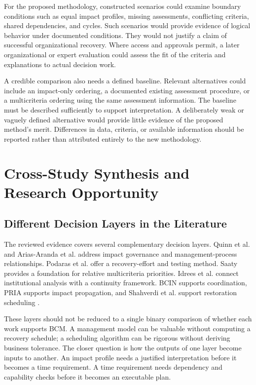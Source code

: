 For the proposed methodology, constructed scenarios could examine boundary conditions such as equal impact profiles, missing assessments, conflicting criteria, shared dependencies, and cycles. Such scenarios would provide evidence of logical behavior under documented conditions. They would not justify a claim of successful organizational recovery. Where access and approvals permit, a later organizational or expert evaluation could assess the fit of the criteria and explanations to actual decision work.

A credible comparison also needs a defined baseline. Relevant alternatives could include an impact-only ordering, a documented existing assessment procedure, or a multicriteria ordering using the same assessment information. The baseline must be described sufficiently to support interpretation. A deliberately weak or vaguely defined alternative would provide little evidence of the proposed method's merit. Differences in data, criteria, or available information should be reported rather than attributed entirely to the new methodology.

\section{Cross-Study Synthesis and Research Opportunity}

\subsection{Different Decision Layers in the Literature}

The reviewed evidence covers several complementary decision layers. Quinn et al. and Arias-Aranda et al. address impact governance and management-process relationships. Podaras et al. offer a recovery-effort and testing method. Saaty provides a foundation for relative multicriteria priorities. Idrees et al. connect institutional analysis with a continuity framework. BCIN supports coordination, PRIA supports impact propagation, and Shahverdi et al. support restoration scheduling \cite{quinn2025bia,reference2026processes,podaras2016tools,saaty2008ahp,idrees2019bcis,saleem2008bcin,raptaki2025propagation,shahverdi2025recovery}.

These layers should not be reduced to a single binary comparison of whether each work supports BCM. A management model can be valuable without computing a recovery schedule; a scheduling algorithm can be rigorous without deriving business tolerance. The closer question is how the outputs of one layer become inputs to another. An impact profile needs a justified interpretation before it becomes a time requirement. A time requirement needs dependency and capability checks before it becomes an executable plan.

